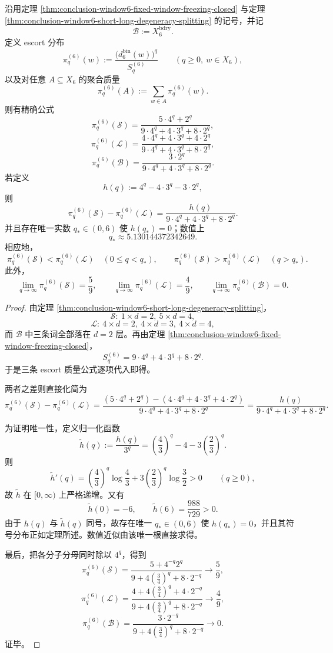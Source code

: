 \begin{theorem}\label{thm:conclusion-window6-short-long-escort-crossover}
沿用定理 \ref{thm:conclusion-window6-fixed-window-freezing-closed} 与定理 \ref{thm:conclusion-window6-short-long-degeneracy-splitting} 的记号，并记
\[
\mathcal B:=X_6^{\mathrm{bdry}}.
\]
定义 escort 分布
\[
\pi_q^{(6)}(w):=
\frac{\bigl(d_6^{\mathrm{bin}}(w)\bigr)^q}{S_q^{(6)}}
\qquad(q\ge 0,\ w\in X_6),
\]
以及对任意 \(A\subseteq X_6\) 的聚合质量
\[
\pi_q^{(6)}(A):=\sum_{w\in A}\pi_q^{(6)}(w).
\]
则有精确公式
\[
\boxed{\;
\pi_q^{(6)}(\mathcal S)
=
\frac{5\cdot 4^q+2^q}{9\cdot 4^q+4\cdot 3^q+8\cdot 2^q},\;}
\]
\[
\boxed{\;
\pi_q^{(6)}(\mathcal L)
=
\frac{4\cdot 4^q+4\cdot 3^q+4\cdot 2^q}{9\cdot 4^q+4\cdot 3^q+8\cdot 2^q},\;}
\]
\[
\boxed{\;
\pi_q^{(6)}(\mathcal B)
=
\frac{3\cdot 2^q}{9\cdot 4^q+4\cdot 3^q+8\cdot 2^q}.\;}
\]
若定义
\[
h(q):=4^q-4\cdot 3^q-3\cdot 2^q,
\]
则
\[
\pi_q^{(6)}(\mathcal S)-\pi_q^{(6)}(\mathcal L)
=
\frac{h(q)}{9\cdot 4^q+4\cdot 3^q+8\cdot 2^q}.
\]
并且存在唯一实数 \(q_\ast\in(0,6)\) 使 \(h(q_\ast)=0\)；数值上
\[
\boxed{\;
q_\ast\approx 5.130144372342649.\;}
\]
相应地，
\[
\boxed{\;
\pi_q^{(6)}(\mathcal S)<\pi_q^{(6)}(\mathcal L)\quad(0\le q<q_\ast),\qquad
\pi_q^{(6)}(\mathcal S)>\pi_q^{(6)}(\mathcal L)\quad(q>q_\ast).\;}
\]
此外，
\[
\boxed{\;
\lim_{q\to\infty}\pi_q^{(6)}(\mathcal S)=\frac59,\qquad
\lim_{q\to\infty}\pi_q^{(6)}(\mathcal L)=\frac49,\qquad
\lim_{q\to\infty}\pi_q^{(6)}(\mathcal B)=0.\;}
\]
\end{theorem}
\begin{proof}
由定理 \ref{thm:conclusion-window6-short-long-degeneracy-splitting}，
\[
\mathcal S:\ 1\times d=2,\ 5\times d=4,
\]
\[
\mathcal L:\ 4\times d=2,\ 4\times d=3,\ 4\times d=4,
\]
而 \(\mathcal B\) 中三条词全部落在 \(d=2\) 层。再由定理 \ref{thm:conclusion-window6-fixed-window-freezing-closed}，
\[
S_q^{(6)}=9\cdot 4^q+4\cdot 3^q+8\cdot 2^q.
\]
于是三条 escort 质量公式逐项代入即得。

两者之差则直接化简为
\[
\pi_q^{(6)}(\mathcal S)-\pi_q^{(6)}(\mathcal L)
=
\frac{(5\cdot 4^q+2^q)-(4\cdot 4^q+4\cdot 3^q+4\cdot 2^q)}
{9\cdot 4^q+4\cdot 3^q+8\cdot 2^q}
=
\frac{h(q)}{9\cdot 4^q+4\cdot 3^q+8\cdot 2^q}.
\]

为证明唯一性，定义归一化函数
\[
\widetilde h(q):=\frac{h(q)}{3^q}
=
\left(\frac43\right)^q-4-3\left(\frac23\right)^q.
\]
则
\[
\widetilde h'(q)
=
\left(\frac43\right)^q\log\frac43
+3\left(\frac23\right)^q\log\frac32
>0
\qquad(q\ge 0),
\]
故 \(\widetilde h\) 在 \([0,\infty)\) 上严格递增。又有
\[
\widetilde h(0)=-6,
\qquad
\widetilde h(6)=\frac{988}{729}>0.
\]
由于 \(h(q)\) 与 \(\widetilde h(q)\) 同号，故存在唯一 \(q_\ast\in(0,6)\) 使 \(h(q_\ast)=0\)，并且其符号分布正如定理所述。数值近似由该唯一根直接求得。

最后，把各分子分母同时除以 \(4^q\)，得到
\[
\pi_q^{(6)}(\mathcal S)
=
\frac{5+4^{-q}2^q}{9+4\left(\frac34\right)^q+8\cdot 2^{-q}}
\longrightarrow \frac59,
\]
\[
\pi_q^{(6)}(\mathcal L)
=
\frac{4+4\left(\frac34\right)^q+4\cdot 2^{-q}}{9+4\left(\frac34\right)^q+8\cdot 2^{-q}}
\longrightarrow \frac49,
\]
\[
\pi_q^{(6)}(\mathcal B)
=
\frac{3\cdot 2^{-q}}{9+4\left(\frac34\right)^q+8\cdot 2^{-q}}
\longrightarrow 0.
\]
证毕。
\end{proof}

